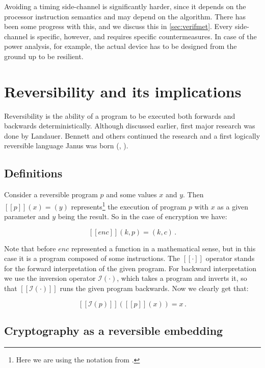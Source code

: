 \documentclass[a4paper,10pt,openright]{memoir}
\def\enc{\ensuremath{\mathit{enc}}}
\newcommand{\inv}[1]{\ensuremath{\mathcal{I}(#1)}}
\newcommand{\exe}[1]{\ensuremath{[\![#1]\!]}}
\begin{document}
Avoiding a timing side-channel is significantly harder, since it 
depends on the processor instruction semantics and may depend on the 
algorithm. There has been some progress with this, and we discuss this 
in \ref{sec:verifmet}. Every side-channel is specific, however, and 
requires specific countermeasures. In case of the power analysis, for 
example, the actual device has to be designed from the ground up to be 
resilient.



\section{Reversibility and its implications}

Reversibility is the ability of a program to be executed both forwards 
and backwards deterministically. Although discussed earlier, first 
major research was done by Landauer\cite{Landauer61}. 
Bennett\cite{Bennett73} and others continued the research and a first 
logically reversible language Janus was born (\cite{janus86}, 
\cite{Yokoyama2010}).

\subsection{Definitions}

Consider a reversible program $p$ and some values $x$ and $y$. Then 
$\exe{p}(x) = (y)$ represents\footnote{Here we are using the notation 
from \cite{Jones93}.} the execution of program $p$ with $x$ as a given 
parameter and $y$ being the result. So in the case of encryption we 
have:

$$
\exe{\enc}(k,p) = (k,c) \,.
$$

Note that before $\enc$ represented a function in a mathematical sense, 
but in this case it is a program composed of some instructions. The 
$\exe{\cdot}$ operator stands for the forward interpretation of the 
given program. For backward interpretation we use the inversion 
operator $\inv{\cdot}$, which takes a program and inverts it, so that 
$\exe{\inv{\cdot}}$ runs the given program backwards. Now we clearly 
get that:

$$
\exe{\inv{p}}(\exe{p}(x)) = x \,.
$$


\subsection{Cryptography as a reversible embedding}
\label{crypto-embed}
\end{document}
